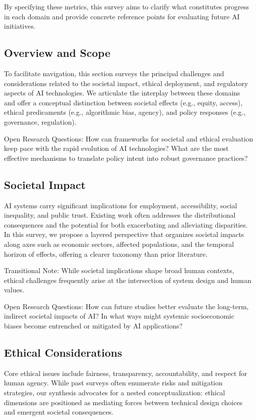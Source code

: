 \documentclass[sigconf]{acmart}
\begin{document}
By specifying these metrics, this survey aims to clarify what constitutes progress in each domain and provide concrete reference points for evaluating future AI initiatives.

\subsection{Overview and Scope}
To facilitate navigation, this section surveys the principal challenges and considerations related to the societal impact, ethical deployment, and regulatory aspects of AI technologies. We articulate the interplay between these domains and offer a conceptual distinction between societal effects (e.g., equity, access), ethical predicaments (e.g., algorithmic bias, agency), and policy responses (e.g., governance, regulation).

Open Research Questions: How can frameworks for societal and ethical evaluation keep pace with the rapid evolution of AI technologies? What are the most effective mechanisms to translate policy intent into robust governance practices?

\subsection{Societal Impact}
AI systems carry significant implications for employment, accessibility, social inequality, and public trust. Existing work often addresses the distributional consequences and the potential for both exacerbating and alleviating disparities. In this survey, we propose a layered perspective that organizes societal impacts along axes such as economic sectors, affected populations, and the temporal horizon of effects, offering a clearer taxonomy than prior literature.

Transitional Note: While societal implications shape broad human contexts, ethical challenges frequently arise at the intersection of system design and human values.

Open Research Questions: How can future studies better evaluate the long-term, indirect societal impacts of AI? In what ways might systemic socioeconomic biases become entrenched or mitigated by AI applications?

\subsection{Ethical Considerations}
Core ethical issues include fairness, transparency, accountability, and respect for human agency. While past surveys often enumerate risks and mitigation strategies, our synthesis advocates for a nested conceptualization: ethical dimensions are positioned as mediating forces between technical design choices and emergent societal consequences.
\end{document}
